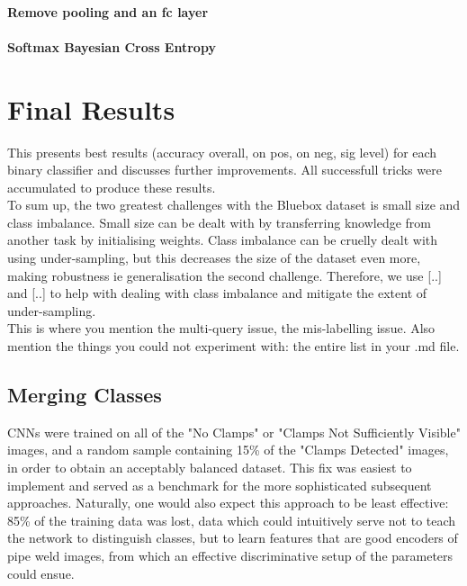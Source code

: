 \documentclass[a4paper,11pt]{article}
\begin{document}
     
\paragraph{Remove pooling and an fc layer}

\paragraph{Softmax Bayesian Cross Entropy}



\section{Final Results}

This presents best results (accuracy overall, on pos, on neg, sig level) for each binary classifier and discusses further improvements. All successfull tricks were accumulated to produce these results. \\

To sum up, the two greatest challenges with the Bluebox dataset is small size and class imbalance. Small size can be dealt with by transferring knowledge from another task by initialising weights. Class imbalance can be cruelly dealt with using under-sampling, but this decreases the size of the dataset even more, making robustness ie generalisation the second challenge. Therefore, we use [..] and [..] to help with dealing with class imbalance and mitigate the extent of under-sampling. \\

This is where you mention the multi-query issue, the mis-labelling issue. Also mention the things you could not experiment with: the entire list in your .md file. \\

\subsection{Merging Classes}

CNNs were trained on all of the "No Clamps" or "Clamps Not Sufficiently Visible" images, and a random sample containing 15\% of the "Clamps Detected" images, in order to obtain an acceptably balanced dataset. This fix was easiest to implement and served as a benchmark for the more sophisticated subsequent approaches. Naturally, one would also expect this approach to be least effective: 85\% of the training data was lost, data which could intuitively serve not to teach the network to distinguish classes, but to learn features that are good encoders of pipe weld images, from which an effective discriminative setup of the parameters could ensue. \\
\end{document}
